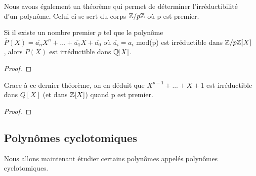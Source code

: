 Nous avons également un théorème qui permet de déterminer l'irréductibilité d'un
polynôme. Celui-ci se sert du corps $\mathbb{Z}/p\mathbb{Z}$ où p est premier.

\begin{theorem}
	Si il existe un nombre premier $p$ tel que le polynôme $\overline{P}(X) =
	\overline{a_{n}}X^{n} + \ldots + \overline{a_{1}}X + \overline{a_{0}}$ où
	$\overline{a_{i}} = a_{i}$ mod(p) est irréductible dans
	$\mathbb{Z}/p\mathbb{Z}[X]$, alors $P(X)$ est irréductible dans $\mathbb{Q}[X]$.
\end{theorem}

\begin{proof}
	
\end{proof}

\begin{corollary}
	Grace à ce dernier théorème, on en déduit que $X^{p - 1} + \ldots + X + 1$
	est irréductible dans $Q[X]$ (et dans $\mathbb{Z}[X]$) quand p est premier.
\end{corollary}

\begin{proof}
	
\end{proof}
\subsection{Polynômes cyclotomiques}

Nous allons maintenant étudier certains polynômes appelés polynômes
cyclotomiques.





